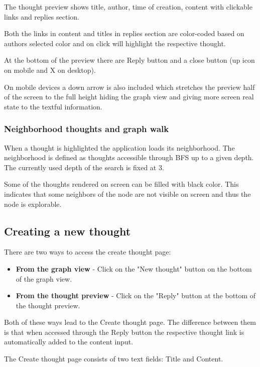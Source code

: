 The thought preview shows title, author, time of creation, content with clickable links and replies section. 

Both the links in content and titles in replies section are color-coded based on authors selected color and on click will highlight the respective thought.

At the bottom of the preview there are Reply button and a close button (up icon on mobile and X on desktop).

On mobile devices a down arrow is also included which stretches the preview half of the screen to the full height
hiding the graph view and giving more screen real state to the textful information.

\subsubsection*{Neighborhood thoughts and graph walk}

When a thought is highlighted the application loads its neighborhood.
The neighborhood is defined as thoughts accessible through BFS  up to a given depth.
The currently used depth of the search is fixed at 3.

Some of the thoughts rendered on screen can be filled with black color. 
This indicates that some neighbors of the node are not visible on screen and thus the node is explorable.
  
\subsection{Creating a new thought}

There are two ways to access the create thought page:
\begin{itemize}
  \item \textbf{From the graph view} - Click on the "New thought" button on the bottom of the graph view.
  \item \textbf{From the thought preview} - Click on the "Reply" button at the bottom of the thought preview.
\end{itemize}

Both of these ways lead to the Create thought page.
The difference between them is that when accessed through the Reply button the respective thought link is automatically added to the content input.

The Create thought page consists of two text fields: Title and Content.

